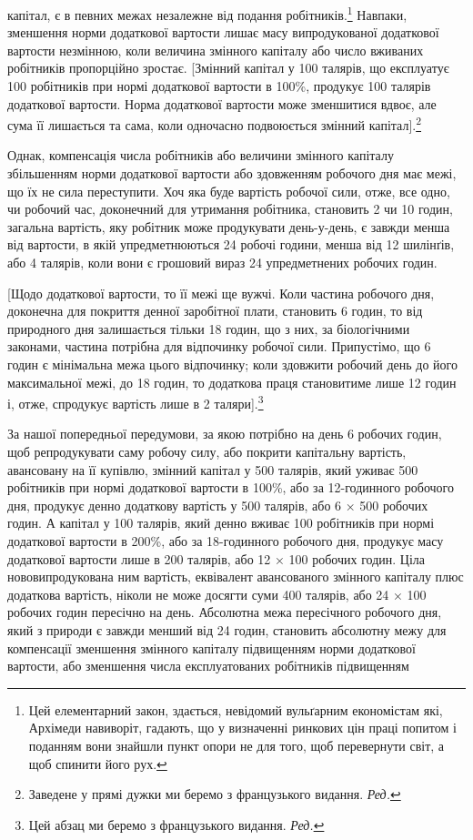 \parcont{}  %
капітал, є в певних межах незалежне від подання робітників.\footnote{
Цей елементарний закон, здається, невідомий вульґарним економістам
які, Архімеди навиворіт, гадають, що у визначенні ринкових цін
праці попитом і поданням вони знайшли пункт опори не для того, щоб
перевернути світ, а щоб спинити його рух.
}
Навпаки, зменшення норми додаткової вартости лишає масу
випродукованої додаткової вартости незмінною, коли величина
змінного капіталу або число вживаних робітників пропорційно
зростає. [Змінний капітал у 100 талярів, що експлуатує 100 робітників
при нормі додаткової вартости в 100\%, продукує 100 талярів
додаткової вартости. Норма додаткової вартости може зменшитися
вдвоє, але сума її лишається та сама, коли одночасно
подвоюється змінний капітал].\footnote*{
Заведене у прямі дужки ми беремо з французького видання. \emph{Ред.}
}

Однак, компенсація числа робітників або величини змінного
капіталу збільшенням норми додаткової вартости або здовженням
робочого дня має межі, що їх не сила переступити. Хоч яка
буде вартість робочої сили, отже, все одно, чи робочий час,
доконечний для утримання робітника, становить 2 чи 10 годин,
загальна вартість, яку робітник може продукувати день-у-день,
є завжди менша від вартости, в якій упредметнюються 24 робочі
години, менша від 12 шилінґів, або 4 талярів, коли вони є грошовий
вираз 24 упредметнених робочих годин.

[Щодо додаткової вартости, то її межі ще вужчі. Коли частина
робочого дня, доконечна для покриття денної заробітної плати,
становить 6 годин, то від природного дня залишається тільки 18 годин,
що з них, за біологічними законами, частина потрібна для
відпочинку робочої сили. Припустімо, що 6 годин є мінімальна
межа цього відпочинку; коли здовжити робочий день до його максимальної
межі, до 18 годин, то додаткова праця становитиме
лише 12 годин і, отже, спродукує вартість лише в 2 таляри].\footnote*{
Цей абзац ми беремо з французького видання. \emph{Ред.}
}

За нашої попередньої передумови, за якою потрібно на день
6 робочих годин, щоб репродукувати саму робочу силу, або
покрити капітальну вартість, авансовану на її купівлю, змінний
капітал у 500 талярів, який уживає 500 робітників при нормі
додаткової вартости в 100\%, або за 12-годинного робочого дня,
продукує денно додаткову вартість у 500 талярів, або 6 × 500
робочих годин. А капітал у 100 талярів, який денно вживає
100 робітників при нормі додаткової вартости в 200\%, або за 18-годинного
робочого дня, продукує масу додаткової вартости лише
в 200 талярів, або 12 × 100 робочих годин. Ціла нововипродукована
ним вартість, еквівалент авансованого змінного капіталу
плюс додаткова вартість, ніколи не може досягти суми 400 талярів,
або 24 × 100 робочих годин пересічно на день. Абсолютна
межа пересічного робочого дня, який з природи є завжди менший
від 24 годин, становить абсолютну межу для компенсації зменшення
змінного капіталу підвищенням норми додаткової вартости,
або зменшення числа експлуатованих робітників підвищенням
\parbreak{}  %
